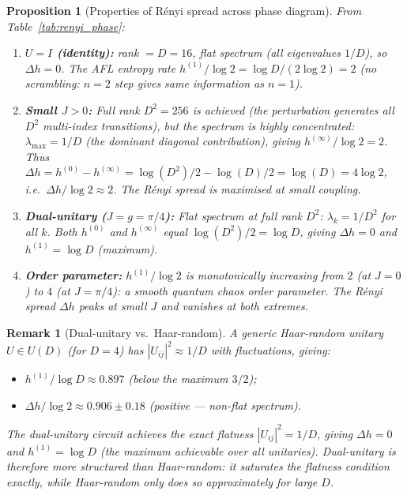 \documentclass[12pt,a4paper]{article}
\newtheorem{proposition}[theorem]{Proposition}
\newtheorem{remark}[theorem]{Remark}
\begin{document}
\begin{proposition}[Properties of Rényi spread across phase diagram]
\label{prop:renyi_spread_phase}
From Table~\ref{tab:renyi_phase}:
\begin{enumerate}
  \item \textbf{$U=I$ (identity):} rank $= D = 16$, flat spectrum (all eigenvalues
    $1/D$), so $\Delta h = 0$.  The AFL entropy rate $h^{(1)}/\log2 = \log D/(2\log2) = 2$
    (no scrambling: $n=2$ step gives same information as $n=1$).

  \item \textbf{Small $J>0$:} Full rank $D^2 = 256$ is achieved (the perturbation
    generates all $D^2$ multi-index transitions), but the spectrum is \emph{highly
    concentrated}: $\lambda_{\max} = 1/D$ (the dominant diagonal contribution),
    giving $h^{(\infty)}/\log2 = 2$.  Thus $\Delta h = h^{(0)}-h^{(\infty)}
    = \log(D^2)/2 - \log(D)/2 = \log(D) = 4\log2$, i.e.\ $\Delta h/\log2 \approx 2$.
    The Rényi spread is \emph{maximised} at small coupling.

  \item \textbf{Dual-unitary ($J=g=\pi/4$):} Flat spectrum at full rank $D^2$:
    $\lambda_k = 1/D^2$ for all $k$.  Both $h^{(0)}$ and $h^{(\infty)}$ equal
    $\log(D^2)/2 = \log D$, giving $\Delta h = 0$ and $h^{(1)} = \log D$ (maximum).

  \item \textbf{Order parameter:} $h^{(1)}/\log 2$ is monotonically increasing from
    $2$ (at $J=0$) to $4$ (at $J=\pi/4$): a smooth quantum chaos order parameter.
    The Rényi spread $\Delta h$ peaks at small $J$ and vanishes at both extremes.
\end{enumerate}
\end{proposition}

\begin{remark}[Dual-unitary vs.\ Haar-random]
  A generic Haar-random unitary $U \in U(D)$ (for $D=4$) has
  $|U_{ij}|^2 \approx 1/D$ with fluctuations, giving:
  \begin{itemize}
    \item $h^{(1)}/\log D \approx 0.897$ (below the maximum $3/2$);
    \item $\Delta h/\log 2 \approx 0.906 \pm 0.18$ (\emph{positive} — non-flat spectrum).
  \end{itemize}
  The dual-unitary circuit achieves the \emph{exact} flatness $|U_{ij}|^2 = 1/D$,
  giving $\Delta h = 0$ and $h^{(1)} = \log D$ (the maximum achievable over all
  unitaries). Dual-unitary is therefore \emph{more structured} than Haar-random:
  it saturates the flatness condition exactly, while Haar-random only does so
  approximately for large $D$.
\end{remark}
\end{document}
